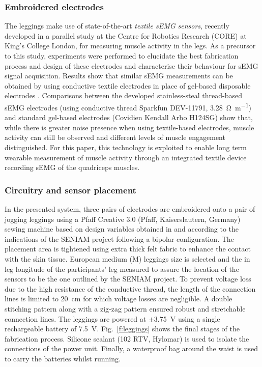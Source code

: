 \documentclass[letterpaper, 10 pt, conference]{ieeeconf}
\newcommand{\fref}[1]{Fig.~\ref{#1}}       \newcommand{\sref}[1]{\S\ref{#1}}          \newcommand{\tref}[1]{\tablename~\ref{#1}} \newcommand{\eref}[1]{(\ref{#1})}
\begin{document}
\subsubsection{Embroidered electrodes} The leggings make use of state-of-the-art
\emph{textile sEMG sensors}, recently developed in a parallel study at the Centre for Robotics Research (CORE) at King's College London, for measuring muscle activity in the legs.
As a precursor to this study, experiments were performed to elucidate the best fabrication process and design of these electrodes and characterise their behaviour for sEMG signal acquisition. Results show
that similar sEMG measurements can be obtained by using conductive textile
electrodes in place of gel-based disposable electrodes \cite{ali}. Comparisons
between the developed stainless-steal thread-based sEMG electrodes (using conductive thread Sparkfun DEV-11791,
\SI{3.28}{\ohm\per\meter}) and standard gel-based electrodes (Covidien Kendall
Arbo H124SG) show that, while there is greater noise presence when using
textile-based electrodes, muscle activity can still be observed and different
levels of muscle engagement distinguished. For this paper, this technology is
exploited to enable long term wearable measurement of  muscle activity through
an integrated textile device recording sEMG of the quadriceps muscles. 

\subsubsection{Circuitry and sensor placement}
In the presented system, three pairs of electrodes are embroidered onto a pair
of jogging leggings using a Pfaff Creative 3.0 (Pfaff, Kaiserslautern, Germany)
sewing machine based on design variables obtained in \cite{ali} and according
to the indications of the SENIAM project following a bipolar configuration. The
placement area is tightened using extra thick felt fabric to enhance the contact
with the skin tissue. European medium (M) leggings size is selected and the in leg longitude of the participants' leg measured to assure the location of the sensors to be the one outlined by the SENIAM project. 
To prevent voltage loss due to the high resistance of the conductive thread,
the length of the connection lines is limited to \SI{20}{\centi\meter} for
which voltage losses are negligible. A double stitching pattern along with a
zig-zag pattern ensured robust and stretchable connection lines. The leggings
are powered at $\pm$\SI{3.75}{\volt} using a single rechargeable battery of
\SI{7.5}{\volt}. \fref{f:leggings} shows the final stages of the
fabrication process. Silicone sealant (102 RTV, Hylomar) is used to isolate
the connections of the power unit. Finally, a waterproof bag around the waist
is used to carry the batteries whilst running.
\end{document}

